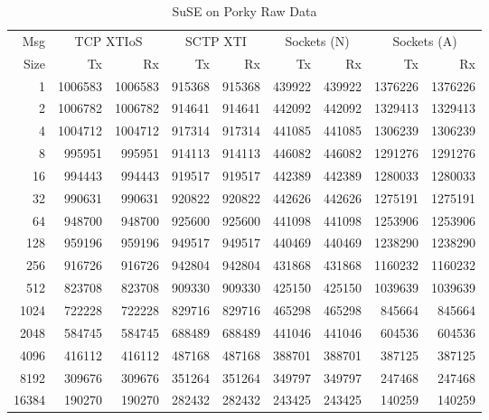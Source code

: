 \documentclass[letterpaper,final,notitlepage,twocolumn,10pt,twoside]{article}
\begin{document}
\begin{appendix}
\begin{table}[hbp]
\footnotesize
\begin{center}
\setlength{\tabcolsep}{0.2em}
\setlength{\arraycolsep}{0.2em}
\begin{tabular}{rrrrrrrrr}\\
Msg & \multicolumn{2}{c}{TCP XTIoS} & \multicolumn{2}{c}{SCTP XTI} & \multicolumn{2}{c}{Sockets (N)} & \multicolumn{2}{c}{Sockets (A)}\\
Size & Tx & Rx & Tx & Rx & Tx & Rx & Tx & Rx\\
\hline
\hline
1 & 1006583 & 1006583 & 915368 & 915368 & 439922 & 439922 & 1376226 & 1376226\\
2 & 1006782 & 1006782 & 914641 & 914641 & 442092 & 442092 & 1329413 & 1329413\\
4 & 1004712 & 1004712 & 917314 & 917314 & 441085 & 441085 & 1306239 & 1306239\\
8 & 995951 & 995951 & 914113 & 914113 & 446082 & 446082 & 1291276 & 1291276\\
16 & 994443 & 994443 & 919517 & 919517 & 442389 & 442389 & 1280033 & 1280033\\
32 & 990631 & 990631 & 920822 & 920822 & 442626 & 442626 & 1275191 & 1275191\\
64 & 948700 & 948700 & 925600 & 925600 & 441098 & 441098 & 1253906 & 1253906\\
128 & 959196 & 959196 & 949517 & 949517 & 440469 & 440469 & 1238290 & 1238290\\
256 & 916726 & 916726 & 942804 & 942804 & 431868 & 431868 & 1160232 & 1160232\\
512 & 823708 & 823708 & 909330 & 909330 & 425150 & 425150 & 1039639 & 1039639\\
1024 & 722228 & 722228 & 829716 & 829716 & 465298 & 465298 & 845664 & 845664\\
2048 & 584745 & 584745 & 688489 & 688489 & 441046 & 441046 & 604536 & 604536\\
4096 & 416112 & 416112 & 487168 & 487168 & 388701 & 388701 & 387125 & 387125\\
8192 & 309676 & 309676 & 351264 & 351264 & 349797 & 349797 & 247468 & 247468\\
16384 & 190270 & 190270 & 282432 & 282432 & 243425 & 243425 & 140259 & 140259\\
\hline
\end{tabular}
\end{center}
\normalsize
\caption[SuSE on Porky Raw Data]{SuSE on Porky Raw Data}
\label{table:susedata}
\end{table}


\end{appendix}
\end{document}
